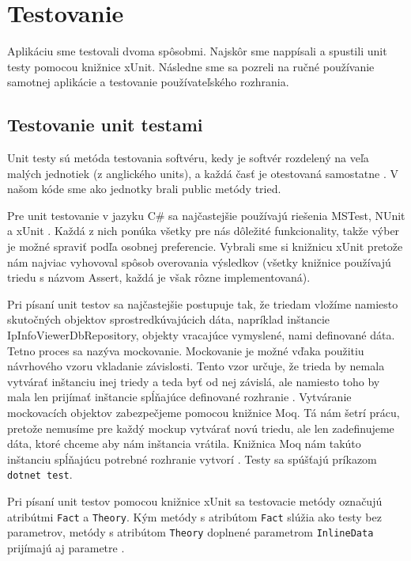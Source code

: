 \chapter{Testovanie}

\label{kap:testovanie}

Aplikáciu sme testovali dvoma spôsobmi. Najskôr sme nappísali a spustili unit testy pomocou knižnice xUnit. Následne sme sa pozreli na ručné používanie 
samotnej aplikácie a testovanie používateľského rozhrania.

\section{Testovanie unit testami}
Unit testy sú metóda testovania softvéru, kedy je softvér rozdelený na veľa malých jednotiek (z anglického units), a každá časť je otestovaná 
samostatne \cite{unit_tests}. V našom kóde sme ako jednotky brali public metódy tried. 

Pre unit testovanie v jazyku C\# sa najčastejšie používajú riešenia MSTest, NUnit a xUnit \cite{unit_test_comparison}. Každá z nich ponúka 
všetky pre nás dôležité funkcionality, takže výber je možné spraviť podľa osobnej preferencie. Vybrali sme si knižnicu xUnit pretože nám 
najviac vyhovoval spôsob overovania výsledkov (všetky knižnice používajú triedu s názvom Assert, každá je však rôzne implementovaná).

Pri písaní unit testov sa najčastejšie postupuje tak, že triedam vložíme namiesto skutočných objektov sprostredkúvajúcich dáta, napríklad inštancie 
IpInfoViewerDbRepository, objekty vracajúce vymyslené, nami definované dáta. Tetno proces sa nazýva mockovanie. Mockovanie je možné vďaka použitiu návrhového 
vzoru vkladanie závislosti. Tento vzor určuje, že trieda by nemala vytvárať inštanciu inej triedy a teda byť od nej závislá, ale namiesto toho by mala len 
prijímať inštancie spĺňajúce definované rozhranie \cite{dependency_injection}. Vytváranie mockovacích objektov zabezpečjeme pomocou knižnice Moq. Tá nám šetrí 
prácu, pretože nemusíme pre každý mockup vytvárať novú triedu, ale len zadefinujeme dáta, ktoré chceme aby nám inštancia vrátila. Knižnica Moq nám 
takúto inštanciu spĺňajúcu potrebné rozhranie vytvorí \cite{moq}. Testy sa spúšťajú príkazom \lstinline{dotnet test}.

Pri písaní unit testov pomocou knižnice xUnit sa testovacie metódy označujú atribútmi \lstinline{Fact} a \lstinline{Theory}. Kým metódy s atribútom 
\lstinline{Fact} slúžia ako testy bez parametrov, metódy s atribútom \lstinline{Theory} doplnené parametrom \lstinline{InlineData} prijímajú aj parametre 
\cite{xunit_docs}.

